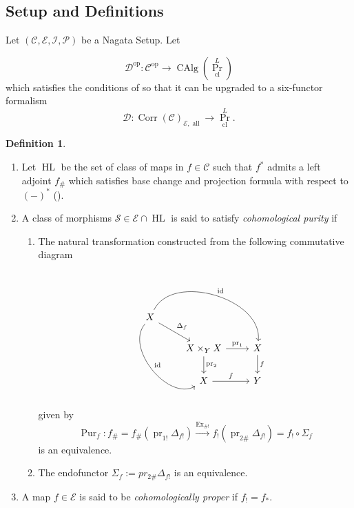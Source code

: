 \documentclass[14pt]{article}
\theoremstyle{definition}
\newtheorem{definition}[theorem]{Definition}
\newcommand{\E}{\mathcal{E}}
\newcommand{\D}{\mathcal{D}}
\renewcommand{\P}{\mathcal{P}}
\newcommand{\op}[1]{\operatorname{#1}}
\renewcommand{\S}{\mathcal{S}}
\newcommand{\I}{\mathscr{I}}
\newcommand{\Ca}{\mathcal{C}}
\numberwithin{subsection}{section}
\begin{document}
\subsection{Setup and Definitions} Let $(\Ca,\E,\I,\P)$ be a Nagata Setup. Let 

\begin{equation}
    \D^{\op{op}} : \Ca^{\op{op}} \to \op{CAlg}(\op{Pr}^{L}_{\op{cl}})
\end{equation}
which satisfies the conditions of \cite[Theorem 5.2.3]{chowdhury2025sixfunctorformalismsiiiconstruction} so that it can be upgraded to a six-functor formalism 
\begin{equation}
    \D : \op{Corr}(\Ca)_{\E,\op{all}} \to \op{Pr}^L_{\op{cl}}.
\end{equation}
\begin{definition}
    \begin{enumerate}
        \item  Let $\op{HL}$ be the set of class of maps in $f \in \Ca$ such that $f^*$ admits a left adjoint $f_{\#}$ which satisfies base change and projection formula with respect to $(-)^*$ (\cite[Remark 8.27]{zhu2025tamecategoricallocallanglands}). 
      
        \item A class of morphisms $\S \in \E \cap \op{HL}$ is said to satisfy \textit{cohomological purity} if 
        \begin{enumerate}
            \item The natural transformation constructed from the following commutative diagram 

            \begin{equation}\label{diagaonalofmorphismdiag}
                \begin{tikzcd}
                    X \arrow[dr,"\Delta_f"] \arrow[ddr,bend right=80,"\op{id}"] \arrow[drr, bend left =80, "\op{id}"] & {} & {}\\
                    {} & X \times_Y X \arrow[r,"\op{pr}_1"] \arrow[d,"\op{pr}_2"] & X \arrow[d,"f"] \\
                    {} & X \arrow[r,"f"] & Y
                      \end{tikzcd}
            \end{equation}
               given by 
        \begin{equation}
            \op{Pur}_f : f_{\#}=f_{\#}(\op{pr}_{1!}\Delta_{f!}) \xrightarrow{\op{Ex}_{\#!}} f_! (\op{pr}_{2\#}\Delta_{f!}) = f_!\circ \Sigma_f
        \end{equation}
        is an equivalence.
        \item The endofunctor $\Sigma_f:=pr_{2\#}\Delta_{f!}$ is an equivalence.
        \end{enumerate}
 \item A map $f \in \E$ is said to be \textit{cohomologically proper} if $f_! = f_*$.    
  \end{enumerate}
\end{definition}
\end{document}
